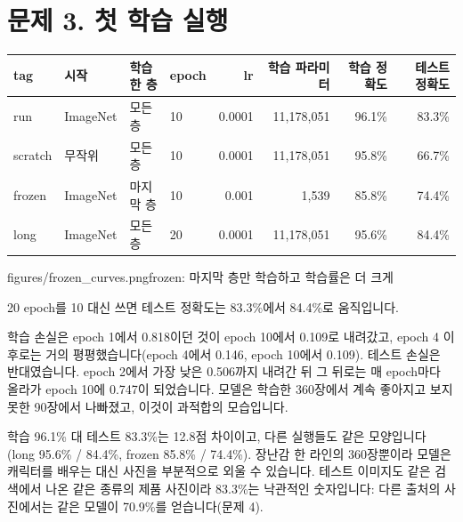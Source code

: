 \documentclass[11pt]{article}
\begin{document}
\section*{문제 3. 첫 학습 실행}

\begin{center}\footnotesize\setlength{\tabcolsep}{4pt}
\begin{tabular}{llllrrrr}
\toprule
tag & 시작 & 학습한 층 & epoch & lr & 학습 파라미터 & 학습 정확도 & 테스트 정확도 \\
\midrule
run     & ImageNet & 모든 층 & 10 & 0.0001 & 11,178,051 & 96.1\% & 83.3\% \\
scratch & 무작위   & 모든 층 & 10 & 0.0001 & 11,178,051 & 95.8\% & 66.7\% \\
frozen  & ImageNet & 마지막 층 & 10 & 0.001  & 1,539      & 85.8\% & 74.4\% \\
long    & ImageNet & 모든 층 & 20 & 0.0001 & 11,178,051 & 95.6\% & 84.4\% \\
\bottomrule
\end{tabular}
\end{center}


           {figures/frozen_curves.png}{frozen: 마지막 층만 학습하고 학습률은
더 크게}


20 epoch를 10 대신 쓰면 테스트 정확도는 83.3\%에서 84.4\%로 움직입니다.

학습 손실은 epoch 1에서 0.818이던 것이 epoch 10에서 0.109로 내려갔고,
epoch 4 이후로는 거의 평평했습니다(epoch 4에서 0.146, epoch 10에서 0.109).
테스트 손실은 반대였습니다.
epoch 2에서 가장 낮은 0.506까지 내려간 뒤 그 뒤로는 매 epoch마다 올라가
epoch 10에 0.747이 되었습니다. 모델은 학습한 360장에서 계속 좋아지고 보지
못한 90장에서 나빠졌고, 이것이 과적합의 모습입니다.

학습 96.1\% 대 테스트 83.3\%는 12.8점 차이이고, 다른 실행들도 같은 모양입니다
(long 95.6\% / 84.4\%, frozen 85.8\% / 74.4\%). 장난감 한 라인의 360장뿐이라
모델은 캐릭터를 배우는 대신 사진을 부분적으로 외울 수 있습니다. 테스트
이미지도 같은 검색에서 나온 같은 종류의 제품 사진이라 83.3\%는 낙관적인
숫자입니다: 다른 출처의 사진에서는 같은 모델이 70.9\%를 얻습니다(문제 4).

\begin{center}\end{center}
\end{document}
